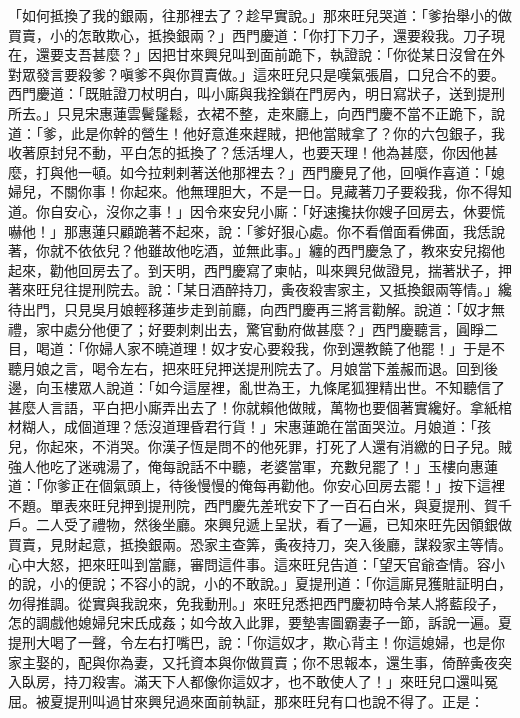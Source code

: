 \begin{showcontents}{}
「如何抵換了我的銀兩，往那裡去了？趁早實說。」那來旺兒哭道：「爹抬舉小的做買賣，小的怎敢欺心，抵換銀兩？」西門慶道：「你打下刀子，還要殺我。刀子現在，還要支吾甚麼？」因把甘來興兒叫到面前跪下，執證說：「你從某日沒曾在外對眾發言要殺爹？嗔爹不與你買賣做。」這來旺兒只是嘆氣張眉，口兒合不的要。西門慶道：「既賍證刀杖明白，叫小廝與我拴鎖在門房內，明日寫狀子，送到提刑所去。」只見宋惠蓮雲鬢鬔鬆，衣裙不整，走來廳上，向西門慶不當不正跪下，說道：「爹，此是你幹的營生！他好意進來趕賊，把他當賊拿了？你的六包銀子，我收著原封兒不動，平白怎的抵換了？恁活埋人，也要天理！他為甚麼，你因他甚麼，打與他一頓。如今拉剌剌著送他那裡去？」西門慶見了他，回嗔作喜道：「媳婦兒，不關你事！你起來。他無理胆大，不是一日。見藏著刀子要殺我，你不得知道。你自安心，沒你之事！」因令來安兒小廝：「好速攙扶你嫂子回房去，休要慌嚇他！」那惠蓮只顧跪著不起來，說：「爹好狠心處。你不看僧面看佛面，我恁說著，你就不依依兒？他雖故他吃酒，並無此事。」纏的西門慶急了，教來安兒搊他起來，勸他回房去了。到天明，西門慶寫了柬帖，叫來興兒做證見，揣著狀子，押著來旺兒往提刑院去。說：「某日酒醉持刀，夤夜殺害家主，又抵換銀兩等情。」纔待出門，只見吳月娘輕移蓮步走到前廳，向西門慶再三將言勸解。說道：「奴才無禮，家中處分他便了；好要刺刺出去，驚官動府做甚麼？」西門慶聽言，圓睜二目，喝道：「你婦人家不曉道理！奴才安心要殺我，你到還教饒了他罷！」于是不聽月娘之言，喝令左右，把來旺兒押送提刑院去了。月娘當下羞赧而退。回到後邊，向玉樓眾人說道：「如今這屋裡，亂世為王，九條尾狐狸精出世。不知聽信了甚麼人言語，平白把小廝弄出去了！你就賴他做賊，萬物也要個著實纔好。拿紙棺材糊人，成個道理？恁沒道理昏君行貨！」宋惠蓮跪在當面哭泣。月娘道：「孩兒，你起來，不消哭。你漢子恆是問不的他死罪，打死了人還有消繳的日子兒。賊強人他吃了迷魂湯了，俺每說話不中聽，老婆當軍，充數兒罷了！」玉樓向惠蓮道：「你爹正在個氣頭上，待後慢慢的俺每再勸他。你安心回房去罷！」按下這裡不題。單表來旺兒押到提刑院，西門慶先差玳安下了一百石白米，與夏提刑、賀千戶。二人受了禮物，然後坐廳。來興兒遞上呈狀，看了一遍，已知來旺先因領銀做買賣，見財起意，抵換銀兩。恐家主查筭，夤夜持刀，突入後廳，謀殺家主等情。心中大怒，把來旺叫到當廳，審問這件事。這來旺兒告道：「望天官爺查情。容小的說，小的便說；不容小的說，小的不敢說。」夏提刑道：「你這廝見獲賍証明白，勿得推調。從實與我說來，免我動刑。」來旺兒悉把西門慶初時令某人將藍段子，怎的調戲他媳婦兒宋氏成姦；如今故入此罪，要墊害圖霸妻子一節，訴說一遍。夏提刑大喝了一聲，令左右打嘴巴，說：「你這奴才，欺心背主！你這媳婦，也是你家主娶的，配與你為妻，又托資本與你做買賣；你不思報本，還生事，倚醉夤夜突入臥房，持刀殺害。滿天下人都像你這奴才，也不敢使人了！」來旺兒口還叫冤屈。被夏提刑叫過甘來興兒過來面前執証，那來旺兒有口也說不得了。正是：


\end{showcontents}

